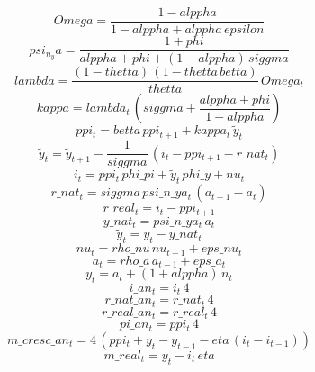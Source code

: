 \documentclass[10pt,a4paper]{article}
\begin{document}
\footnotesize
\begin{dmath*}
Omega = \frac{1-alppha}{1-alppha+alppha\, epsilon}
\end{dmath*}
\begin{dmath*}
psi_n_ya = \frac{1+phi}{alppha+phi+\left(1-alppha\right)\, siggma}
\end{dmath*}
\begin{dmath*}
lambda = \frac{\left(1-thetta\right)\, \left(1-thetta\, betta\right)}{thetta}\, Omega_{t}
\end{dmath*}
\begin{dmath*}
kappa = lambda_{t}\, \left(siggma+\frac{alppha+phi}{1-alppha}\right)
\end{dmath*}
\begin{dmath}
ppi_{t}=betta\, ppi_{t+1}+kappa_{t}\, \tilde{y}_{t}
\end{dmath}
\begin{dmath}
\tilde{y}_{t}=\tilde{y}_{t+1}-\frac{1}{siggma}\, \left(i_{t}-ppi_{t+1}-r\_nat_{t}\right)
\end{dmath}
\begin{dmath}
i_{t}=ppi_{t}\, phi\_pi+\tilde{y}_{t}\, phi\_y+nu_{t}
\end{dmath}
\begin{dmath}
r\_nat_{t}=siggma\, psi\_n\_ya_{t}\, \left(a_{t+1}-a_{t}\right)
\end{dmath}
\begin{dmath}
r\_real_{t}=i_{t}-ppi_{t+1}
\end{dmath}
\begin{dmath}
y\_nat_{t}=psi\_n\_ya_{t}\, a_{t}
\end{dmath}
\begin{dmath}
\tilde{y}_{t}=y_{t}-y\_nat_{t}
\end{dmath}
\begin{dmath}
nu_{t}=rho\_nu\, nu_{t-1}+eps\_nu_{t}
\end{dmath}
\begin{dmath}
a_{t}=rho\_a\, a_{t-1}+eps\_a_{t}
\end{dmath}
\begin{dmath}
y_{t}=a_{t}+\left(1+alppha\right)\, n_{t}
\end{dmath}
\begin{dmath}
i\_an_{t}=i_{t}\, 4
\end{dmath}
\begin{dmath}
r\_nat\_an_{t}=r\_nat_{t}\, 4
\end{dmath}
\begin{dmath}
r\_real\_an_{t}=r\_real_{t}\, 4
\end{dmath}
\begin{dmath}
pi\_an_{t}=ppi_{t}\, 4
\end{dmath}
\begin{dmath}
m\_cresc\_an_{t}=4\, \left(ppi_{t}+y_{t}-y_{t-1}-eta\, \left(i_{t}-i_{t-1}\right)\right)
\end{dmath}
\begin{dmath}
m\_real_{t}=y_{t}-i_{t}\, eta
\end{dmath}
\end{document}
